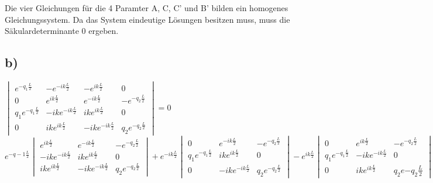    Die vier Gleichungen für die 4 Paramter A, C, C' und B' bilden ein
    homogenes Gleichungssystem. Da das System eindeutige Lösungen besitzen muss,
    muss die Säkulardeterminante 0 ergeben.
    \subsection{b)}
$
    \begin{vmatrix}
        e^{-q_1 \frac{L}{2}} & -e^{-ik \frac{L}{2}} & -e^{ik\frac{L}{2}} & 0\\
        0 & e^{ik \frac{L}{2}} & e^{-ik\frac{L}{2}}  & -e^{-q_2 \frac{L}{2}}   \\
        q_1 e^{-q_1 \frac{L}{2}} & -ik e^{-ik \frac{L}{2}} & ik e^{ik \frac{L}{2}} & 0  \\
        0 & ik e^{ik \frac{L}{2}} & -ik e^{-ik \frac{L}{2}} & q_2 e^{-q_2 \frac{L}{2}}  
    \end{vmatrix}
    =0
$
$
e^{-q-1 \frac{L}{2}}
\begin{vmatrix}
  e^{ik \frac{L}{2}}  & e^{-ik \frac{L}{2}} & - e^{-q_2 \frac{L}{2}}\\
  -ik e^{-ik\frac{L}{2}}  & ik e^{ik\frac{L}{2}} & 0\\
  ik e^{ik\frac{L}{2}}  & -ik e^{-ik \frac{L}{2}}  & q_2 e^{- q_2 \frac{L}{2}}
\end{vmatrix}
+ e^{-ik\frac{L}{2}}
\begin{vmatrix}
 0  & e^{-ik \frac{L}{2}} & - e^{-q_2 \frac{L}{2}}\\
  q_1 e^{-q_1 \frac{L}{2}} & ik e^{ik \frac{L}{2}} & 0 \\
 0  & -ik e^{-ik \frac{L}{2}} & q_2 e^{-q_2 \frac{L}{2}} 
\end{vmatrix}
-e^{ik\frac{L}{2}}
\begin{vmatrix}
 0  &  e^{ik \frac{L}{2}} & -e^{-q_2 \frac{L}{2}} \\   
 q_1 e^{-q_1 \frac{L}{2}}  & -ik e^{-ik \frac{L}{2}}  & 0   \\
 0  &  ik e^{ik \frac{L}{2}} & q_2 e{-q_2 \frac{L}{2}}   
\end{vmatrix}
+0 = 0 
$


